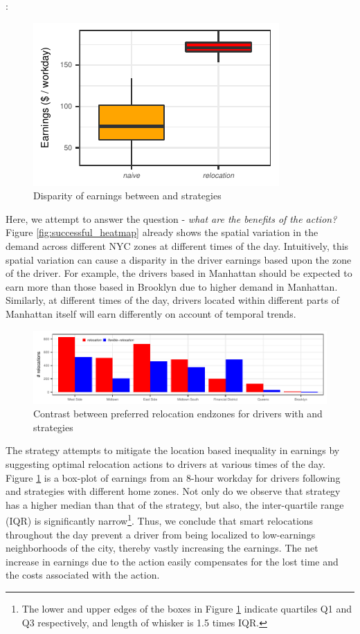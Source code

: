 : 
\begin{figure}
	\includegraphics{figures/earnings_heatmap.pdf}
	\caption{Disparity of earnings between {\naive} and {\relocation} strategies}
	\label{fig:earnings_heatmap}
\end{figure}
Here, we attempt to answer the question - \textit{what are the benefits of the {\relocate} action?} Figure \ref{fig:successful_heatmap} already shows the spatial variation in the demand across different NYC zones at different times of the day. Intuitively, this spatial variation can cause a disparity in the driver earnings based upon the zone of the driver. For example, the drivers based in Manhattan should be expected to earn more than those based in Brooklyn due to higher demand in Manhattan. Similarly, at different times of the day, drivers located within different parts of Manhattan itself will earn differently on account of temporal trends.

\begin{figure}
	\centering
	\includegraphics{figures/relocation_endzones.pdf}
	\caption{Contrast between preferred relocation endzones for drivers with 
	{\relocation} and {\relocationflexible} strategies}
	\label{fig:relocation_endzones}
\end{figure}

The {\relocation} strategy attempts to mitigate the location based inequality in earnings by suggesting optimal relocation actions to drivers at various times of the day. Figure \ref{fig:earnings_heatmap} is a box-plot of earnings from an 8-hour workday for drivers following {\naive} and {\relocation} strategies with different home zones. Not only do we observe that {\relocation} strategy has a higher median than that of the {\naive} strategy, but also, the inter-quartile range (IQR) is significantly narrow\footnote{The lower and upper edges of the boxes in Figure \ref{fig:earnings_heatmap} indicate quartiles Q1 and Q3 respectively, and length of whisker is 1.5 times IQR.}. Thus, we conclude that smart relocations throughout the day prevent a driver from being localized to low-earnings neighborhoods of the city, thereby vastly increasing the earnings. The net increase in earnings due to the {\relocate} action easily compensates for the lost time and the costs associated with the action.

